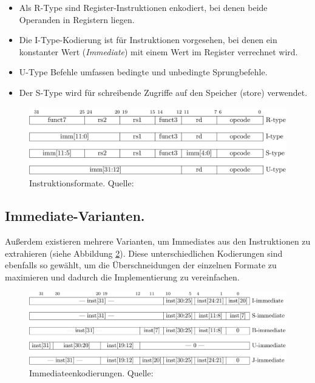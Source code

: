 \begin{itemize}  
\item Als R-Type sind Register-Instruktionen enkodiert, bei denen beide Operanden in Registern liegen. 
\item Die I-Type-Kodierung ist für Instruktionen vorgesehen, bei denen ein konstanter Wert (\textit{Immediate}) mit einem Wert im Register verrechnet wird.
\item U-Type Befehle umfassen bedingte und unbedingte Sprungbefehle.
\item Der S-Type wird für schreibende Zugriffe auf den Speicher (store) verwendet. 
\end{itemize}

\begin{figure} [h]
  \centering
  \includegraphics[width=\textwidth]{Figures/instruction_formats}
  \caption{Instruktionsformate. Quelle: \citep[S. 11]{RISC}}
  \label{fig:instr_types}
\end{figure}

\subsection{Immediate-Varianten.} Außerdem existieren mehrere Varianten,
um Immediates aus den Instruktionen zu extrahieren (siehe Abbildung
\ref{fig:immediates}). Diese unterschiedlichen Kodierungen sind ebenfalls so gewählt, um die Überschneidungen der einzelnen Formate zu maximieren und dadurch die Implementierung zu vereinfachen. \cite[S. 11f.]{RISC} 

\begin{figure} [ht]
  \centering
  \includegraphics[width=\textwidth]{Figures/immediates}
  \caption{Immediateenkodierungen. Quelle: \citep[S. 12]{RISC}}
  \label{fig:immediates}
\end{figure}

